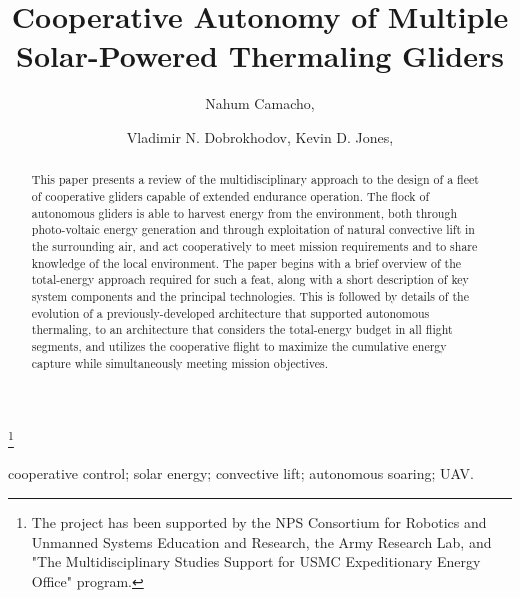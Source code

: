 \documentclass{ifacconf}
\begin{document}
\begin{frontmatter}

\title{Cooperative Autonomy of Multiple Solar-Powered Thermaling Gliders
}

\thanks[footnoteinfo]{The project has been supported by the NPS Consortium for
Robotics and Unmanned Systems Education and Research, the Army Research Lab,
and "The Multidisciplinary Studies Support for USMC Expeditionary Energy
Office" program.}

\author[First]{Nahum Camacho,}
\author[Second]{Vladimir N. Dobrokhodov, Kevin D. Jones,}

\address[First]{Graduate student at the Department of Mechanical and Aerospace Engineering,
Naval
Postgraduate School, Monterey, CA 93943 USA (e-mail: ncamacho@nps.edu)}
\address[Second]{Research Associate Professors at the Department  of Mechanical and Aerospace
Engineering, Naval Postgraduate School, Monterey, CA 93943 USA (e-mail: {vndobrok,
kdjones}@nps.edu)}


\begin{keyword}                           %
cooperative control; solar energy; convective lift; autonomous soaring; UAV.
\end{keyword}                             %


\begin{abstract}                          %
This paper presents a review of the multidisciplinary approach to the
design of a fleet of cooperative gliders capable of extended endurance
operation. The flock of autonomous gliders is able to harvest energy from
the environment, both through photo-voltaic energy generation and through
exploitation of natural convective lift in the surrounding air, and act
cooperatively to meet mission requirements and to share knowledge of the
local environment. The paper begins with a brief overview of the
total-energy approach required for such a feat, along with a short
description of key system components and the principal technologies. This
is followed by details of the evolution of a previously-developed
architecture that supported autonomous thermaling, to an architecture that
considers the total-energy budget in all flight segments, and utilizes the
cooperative flight to maximize the cumulative energy capture while
simultaneously meeting mission objectives.
\end{abstract}

\end{frontmatter}
\end{document}
